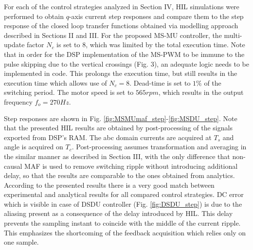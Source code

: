 \documentclass[journal]{IEEEtran}
\begin{document}
For each of the control strategies analyzed in Section IV, HIL simulations were performed to obtain $q$-axis current step responses and compare them to the step response of the closed loop transfer functions obtained via modelling approach described in Sections II and III. For the proposed MS-MU controller, the multi-update factor $N_c$ is set to $8$, which was limited by the total execution time. Note that in order for the DSP implementation of the MS-PWM to be immune to the pulse skipping due to the vertical crossings (Fig. 3), an adequate logic needs to be implemented in code. This prolongs the execution time, but still results in the execution time which allows use of $N_c=8$. Dead-time is set to $1\%$ of the switching period. The motor speed is set to $565rpm$, which results in the output frequency $f_o=270Hz$.

Step responses are shown in Fig. \ref{fig:MSMUmaf_step}-\ref{fig:MSDU_step}. Note that the presented HIL results are obtained by post-processing of the signals exported from DSP’s RAM. The abc domain currents are acquired at $T_s$ and angle is acquired on $T_c$. Post-processing assumes transformation and averaging in the similar manner as described in Section III, with the only difference that non-causal MAF is used to remove switching ripple without introducing additional delay, so that the results are comparable to the ones obtained from analytics. According to the presented results there is a very good match between experimental and analytical results for all compared control strategies. DC error which is visible in case of DSDU controller (Fig. \ref{fig:DSDU_step}) is due to the aliasing present as a consequence of the delay introduced by HIL. This delay prevents the sampling instant to coincide with the middle of the current ripple. This emphasizes the shortcoming of the feedback acquisition which relies only on one sample. 
\end{document}
